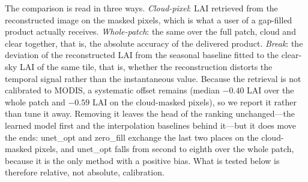 \documentclass[a4paper,fleqn]{cas-dc}
\begin{document}
The comparison is read in three ways. \emph{Cloud-pixel}: LAI retrieved from the reconstructed image on the masked pixels, which is what a user of a gap-filled product actually receives. \emph{Whole-patch}: the same over the full patch, cloud and clear together, that is, the absolute accuracy of the delivered product. \emph{Break}: the deviation of the reconstructed LAI from the seasonal baseline fitted to the clear-sky LAI of the same tile, that is, whether the reconstruction distorts the temporal signal rather than the instantaneous value. Because the retrieval is not calibrated to MODIS, a systematic offset remains (median $-0.40$ LAI over the whole patch and $-0.59$ LAI on the cloud-masked pixels), so we report it rather than tune it away. Removing it leaves the head of the ranking unchanged---the learned model first and the interpolation baselines behind it---but it does move the ends: unet\_opt and zero\_fill exchange the last two places on the cloud-masked pixels, and unet\_opt falls from second to eighth over the whole patch, because it is the only method with a positive bias. What is tested below is therefore relative, not absolute, calibration.
\end{document}
